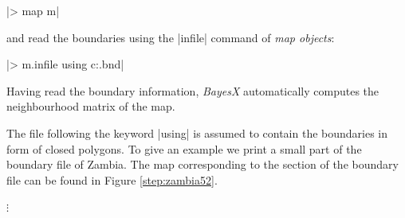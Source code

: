 |> map m|

and read the boundaries using the |infile| command of {\it map objects}:

|> m.infile using c:\data\zambia.bnd|

Having read the boundary information, {\it BayesX} automatically computes the neighbourhood matrix of the map.

The file following the keyword |using| is assumed to contain the boundaries in form of closed polygons. To give an example we
print a small part of the boundary file of Zambia. The map corresponding to the section of the boundary file can be found in
Figure \ref{step:zambia52}.

\footnotesize

\hspace{1cm}  $\vdots$

